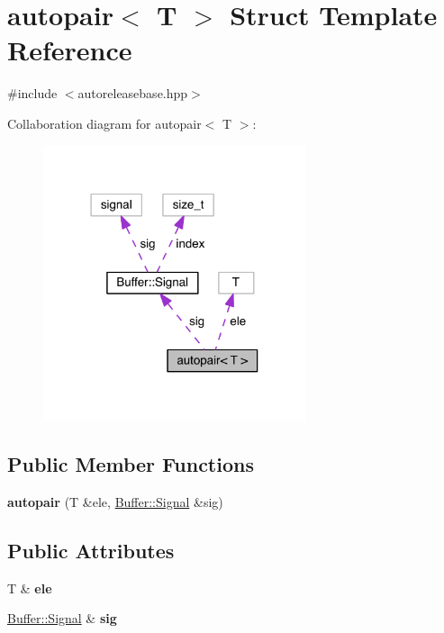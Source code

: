\hypertarget{structautopair}{}\section{autopair$<$ T $>$ Struct Template Reference}
\label{structautopair}


{\ttfamily \#include $<$autoreleasebase.\+hpp$>$}



Collaboration diagram for autopair$<$ T $>$\+:
\nopagebreak
\begin{figure}[H]
\begin{center}
\leavevmode
\includegraphics[width=219pt]{structautopair__coll__graph}
\end{center}
\end{figure}
\subsection*{Public Member Functions}
\begin{DoxyCompactItemize}
\item 
\hypertarget{structautopair_a1d2579cf46990324db585e503b7d1e2b}{}\label{structautopair_a1d2579cf46990324db585e503b7d1e2b} 
{\bfseries autopair} (T \&ele, \hyperlink{struct_buffer_1_1_signal}{Buffer\+::\+Signal} \&sig)
\end{DoxyCompactItemize}
\subsection*{Public Attributes}
\begin{DoxyCompactItemize}
\item 
\hypertarget{structautopair_a689ed2b7027d53831ea76d0131bd416f}{}\label{structautopair_a689ed2b7027d53831ea76d0131bd416f} 
T \& {\bfseries ele}
\item 
\hypertarget{structautopair_a5c4e5b72c053a2606e3cc4b3cb7b8b88}{}\label{structautopair_a5c4e5b72c053a2606e3cc4b3cb7b8b88} 
\hyperlink{struct_buffer_1_1_signal}{Buffer\+::\+Signal} \& {\bfseries sig}
\end{DoxyCompactItemize}


